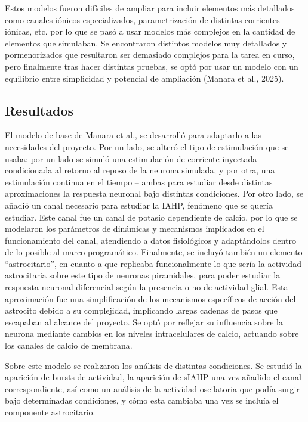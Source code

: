 \documentclass[12pt,a4paper]{report}
\begin{document}
Estos modelos fueron difíciles de ampliar para incluir elementos más detallados como canales iónicos especializados, parametrización de distintas corrientes iónicas, etc. por lo que se pasó a usar modelos más complejos en la cantidad de elementos que simulaban. Se encontraron distintos modelos muy detallados y pormenorizados que resultaron ser demasiado complejos para la tarea en curso, pero finalmente tras hacer distintas pruebas, se optó por usar un modelo con un equilibrio entre simplicidad y potencial de ampliación (Manara et al., 2025).


\subsection{Resultados}

El modelo de base de Manara et al., se desarrolló para adaptarlo a las necesidades del proyecto. Por un lado, se alteró el tipo de estimulación que se usaba: por un lado se simuló una estimulación de corriente inyectada condicionada al retorno al reposo de la neurona simulada, y por otra, una estimulación continua en el tiempo – ambas para estudiar desde distintas aproximaciones la respuesta neuronal bajo distintas condiciones. Por otro lado, se añadió un canal necesario para estudiar la IAHP, fenómeno que se quería estudiar. Este canal fue un canal de potasio dependiente de calcio, por lo que se modelaron los parámetros de dinámicas y mecanismos implicados en el funcionamiento del canal, atendiendo a datos fisiológicos y adaptándolos dentro de lo posible al marco programático. Finalmente, se incluyó también un elemento “astrocitario”, en cuanto a que replicaba funcionalmente lo que sería la actividad astrocitaria sobre este tipo de neuronas piramidales, para poder estudiar la respuesta neuronal diferencial según la presencia o no de actividad glial. Esta aproximación fue una simplificación de los mecanismos específicos de acción del astrocito debido a su complejidad, implicando largas cadenas de pasos que escapaban al alcance del proyecto. Se optó por reflejar su influencia sobre la neurona mediante cambios en los niveles intracelulares de calcio, actuando sobre los canales de calcio de membrana. 

Sobre este modelo se realizaron los análisis de distintas condiciones. Se estudió la aparición de bursts de actividad, la aparición de sIAHP una vez añadido el canal correspondiente, así como un análisis de la actividad oscilatoria que podía surgir bajo determinadas condiciones, y cómo esta cambiaba una vez se incluía el componente astrocitario. 
\end{document}
